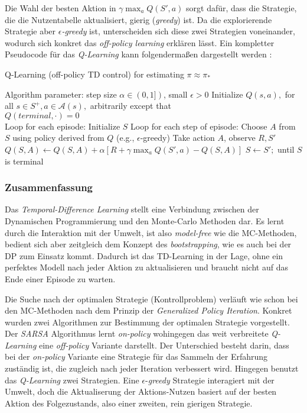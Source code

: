 Die Wahl der besten Aktion in $\gamma \max_a Q(S',a)$ sorgt dafür, dass die Strategie, die die Nutzentabelle aktualisiert, gierig (\textit{greedy}) ist. Da die explorierende Strategie aber $\epsilon$\textit{-greedy} ist, unterscheiden sich diese zwei Strategien voneinander, wodurch sich konkret das \textit{off-policy learning} erklären lässt. Ein kompletter Pseudocode für das \textit{Q-Learning} kann folgendermaßen dargestellt werden \cite[S.~131]{Sutton1998}:
\begin{algorithm}
    \caption{Q-Learning (off-policy TD control) for estimating $\pi \approx \pi_*$}
    \begin{algorithmic}[1]
        \State Algorithm parameter: step size $\alpha \in (0,1])$, small $\epsilon > 0$
        \State Initialize $Q(s,a),$ for all $s \in S^+, a \in \mathcal{A}(s),$ arbitrarily except that \\ $Q(terminal, \mathord{\cdot}) = 0$
        \\
        \State Loop for each episode:
        \Indent
            \State Initialize $S$
            \State Loop for each step of episode:
            \Indent
                \State Choose $A$ from $S$ using policy derived from $Q$ (e.g., $\epsilon$-greedy)
                \State Take action $A$, observe $R, S'$
                \State $Q(S,A) \gets Q(S,A) + \alpha [R + \gamma \max_a Q(S',a) - Q(S,A)]$
                \State $S \gets S';$
            \EndIndent
            \State until $S$ is terminal
        \EndIndent 
    \end{algorithmic}
\end{algorithm}

\subsubsection{Zusammenfassung}
Das \textit{Temporal-Difference Learning} stellt eine Verbindung zwischen der Dynamischen Programmierung und den Monte-Carlo Methoden dar. Es lernt durch die Interaktion mit der Umwelt, ist also \textit{model-free} wie die MC-Methoden, bedient sich aber zeitgleich dem Konzept des \textit{bootstrapping}, wie es auch bei der DP zum Einsatz kommt. Dadurch ist das TD-Learning in der Lage, ohne ein perfektes Modell nach jeder Aktion zu aktualisieren und braucht nicht auf das Ende einer Episode zu warten.
\par 
Die Suche nach der optimalen Strategie (Kontrollproblem) verläuft wie schon bei den MC-Methoden nach dem Prinzip der \textit{Generalized Policy Iteration}. Konkret wurden zwei Algorithmen zur Bestimmung der optimalen Strategie vorgestellt. Der \textit{SARSA} Algorithmus lernt \textit{on-policy} wohingegen das weit verbreitete \textit{Q-Learning} eine \textit{off-policy} Variante darstellt. Der Unterschied besteht darin, dass bei der \textit{on-policy} Variante eine Strategie für das Sammeln der Erfahrung zuständig ist, die zugleich nach jeder Iteration verbessert wird. Hingegen benutzt das \textit{Q-Learning} zwei Strategien. Eine $\epsilon$-\textit{greedy} Strategie interagiert mit der Umwelt, doch die Aktualiserung der Aktions-Nutzen basiert auf der besten Aktion des Folgezustands, also einer zweiten, rein gierigen Strategie.